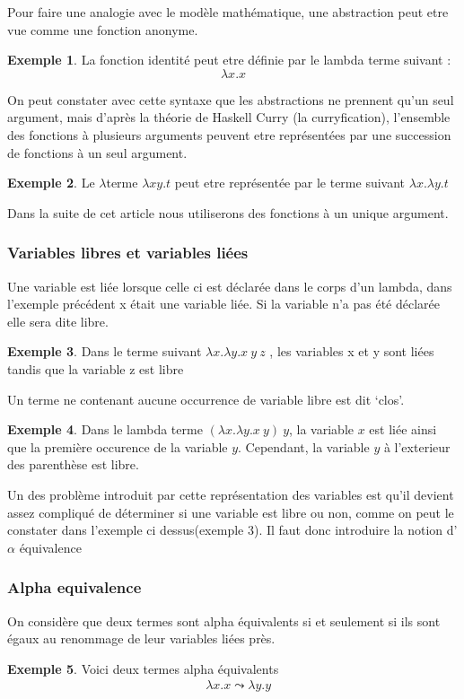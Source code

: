 \documentclass {article}
\theoremstyle{definition}
\newtheorem{example}{Exemple}
\theoremstyle{remark}
\begin{document}
Pour faire une analogie avec le modèle mathématique, une abstraction peut 
etre vue comme une fonction anonyme.
 
\begin{example}
 La fonction identité peut etre définie par le lambda terme suivant :
  \[ 
  \lambda x. x
  \]
\end{example}

On peut constater avec cette syntaxe que les abstractions ne prennent qu'un
seul argument, mais d'après la théorie de Haskell Curry (la curryfication), 
l'ensemble des fonctions à plusieurs arguments peuvent etre représentées 
par une succession de fonctions à un seul argument.
\begin{example}
Le \(\lambda\)terme  \(\lambda xy.t\) peut etre représentée par le terme suivant
\(\lambda x.\lambda y.t\)   
\end{example} 
Dans la suite de cet article nous utiliserons des fonctions à un unique 
argument. 

\subsubsection{Variables libres et variables liées}

Une variable est liée lorsque celle ci est déclarée dans le corps d'un lambda, 
dans l'exemple précédent x était une variable liée. 
Si la variable n'a pas été déclarée elle sera dite libre. 

\begin{example}
  Dans le terme suivant \(\lambda x.\lambda y.x\:y\:z\) , les variables x et 
  y sont liées tandis que la variable z est libre 
\end{example}

Un terme ne contenant aucune occurrence de variable libre est dit `clos'.
\begin{example}
  Dans le lambda terme \((\lambda x. \lambda y. x\: y)\: y\), la
  variable \(x\) est liée ainsi que la première occurence de la
  variable \(y\). Cependant, la variable \(y\) à l'exterieur des
  parenthèse est libre.
\end{example}

Un des problème introduit par cette représentation des variables est qu'il devient assez compliqué de déterminer si une variable est libre ou non, comme on peut le constater dans l'exemple ci dessus(exemple 3). Il faut donc introduire la notion d'\(\alpha\) équivalence

\subsubsection{Alpha equivalence}
On considère que deux termes sont alpha équivalents si et seulement si ils sont 
égaux au renommage de leur variables liées près. 
\begin{example}
  Voici deux termes alpha équivalents 
  \begin{align*}
    & \lambda x.x \leadsto \lambda y.y \\
  \end{align*}
\end{example}
  
\end{document}

